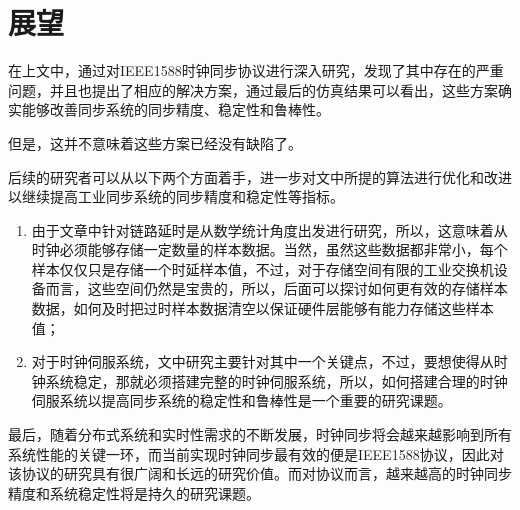 \section{展望}
在上文中，通过对IEEE1588时钟同步协议进行深入研究，发现了其中存在的严重问题，并且也提出了相应的解决方案，通过最后的仿真结果可以看出，这些方案确实能够改善同步系统的同步精度、稳定性和鲁棒性。

但是，这并不意味着这些方案已经没有缺陷了。

后续的研究者可以从以下两个方面着手，进一步对文中所提的算法进行优化和改进以继续提高工业同步系统的同步精度和稳定性等指标。
\begin{enumerate}[noitemsep,topsep=0pt,parsep=0pt,partopsep=0pt]
	\item 由于文章中针对链路延时是从数学统计角度出发进行研究，所以，这意味着从时钟必须能够存储一定数量的样本数据。当然，虽然这些数据都非常小，每个样本仅仅只是存储一个时延样本值，不过，对于存储空间有限的工业交换机设备而言，这些空间仍然是宝贵的，所以，后面可以探讨如何更有效的存储样本数据，如何及时把过时样本数据清空以保证硬件层能够有能力存储这些样本值；
	\item 对于时钟伺服系统，文中研究主要针对其中一个关键点，不过，要想使得从时钟系统稳定，那就必须搭建完整的时钟伺服系统，所以，如何搭建合理的时钟伺服系统以提高同步系统的稳定性和鲁棒性是一个重要的研究课题。
\end{enumerate}

最后，随着分布式系统和实时性需求的不断发展，时钟同步将会越来越影响到所有系统性能的关键一环，而当前实现时钟同步最有效的便是IEEE1588协议，因此对该协议的研究具有很广阔和长远的研究价值。而对协议而言，越来越高的时钟同步精度和系统稳定性将是持久的研究课题。